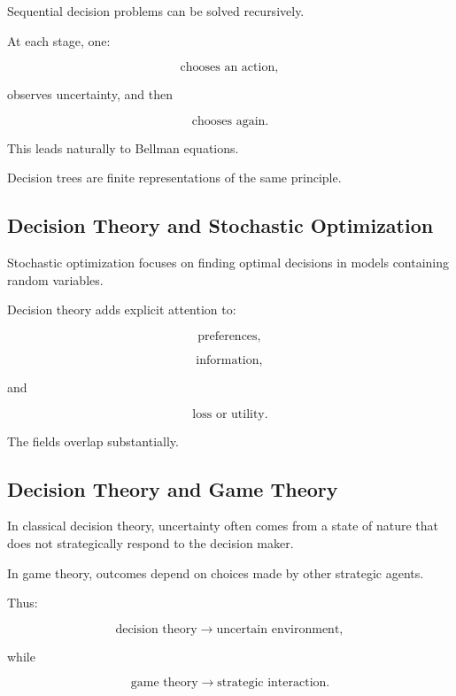 Sequential decision problems can be solved recursively.

At each stage, one:

\[
\boxed{
\text{chooses an action},
}
\]

observes uncertainty, and then

\[
\boxed{
\text{chooses again}.
}
\]

This leads naturally to Bellman equations.

Decision trees are finite representations of the same principle.

\subsection{Decision Theory and Stochastic Optimization}
\label{subsec:decision-theory-stochastic-optimization}

Stochastic optimization focuses on finding optimal decisions in models
containing random variables.

Decision theory adds explicit attention to:

\[
\boxed{
\text{preferences},
}
\]

\[
\boxed{
\text{information},
}
\]

and

\[
\boxed{
\text{loss or utility}.
}
\]

The fields overlap substantially.

\subsection{Decision Theory and Game Theory}
\label{subsec:decision-theory-game-theory}

In classical decision theory, uncertainty often comes from a state of
nature that does not strategically respond to the decision maker.

In game theory, outcomes depend on choices made by other strategic agents.

Thus:

\[
\boxed{
\text{decision theory}
\rightarrow
\text{uncertain environment},
}
\]

while

\[
\boxed{
\text{game theory}
\rightarrow
\text{strategic interaction}.
}
\]

